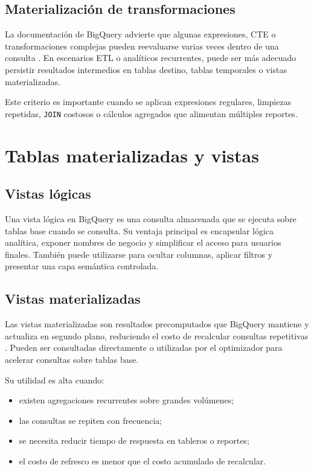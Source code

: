 \documentclass[12pt]{article}
\begin{document}
\subsection{Materialización de transformaciones}
La documentación de BigQuery advierte que algunas expresiones, CTE o transformaciones complejas pueden reevaluarse varias veces dentro de una consulta \cite{gcp_optimize_queries_compute}. En escenarios ETL o analíticos recurrentes, puede ser más adecuado persistir resultados intermedios en tablas destino, tablas temporales o vistas materializadas.

Este criterio es importante cuando se aplican expresiones regulares, limpiezas repetidas, \texttt{JOIN} costosos o cálculos agregados que alimentan múltiples reportes.

\section{Tablas materializadas y vistas}
\subsection{Vistas lógicas}
Una vista lógica en BigQuery es una consulta almacenada que se ejecuta sobre tablas base cuando se consulta. Su ventaja principal es encapsular lógica analítica, exponer nombres de negocio y simplificar el acceso para usuarios finales. También puede utilizarse para ocultar columnas, aplicar filtros y presentar una capa semántica controlada.

\subsection{Vistas materializadas}
Las vistas materializadas son resultados precomputados que BigQuery mantiene y actualiza en segundo plano, reduciendo el costo de recalcular consultas repetitivas \cite{gcp_materialized_views_intro}. Pueden ser consultadas directamente o utilizadas por el optimizador para acelerar consultas sobre tablas base.

Su utilidad es alta cuando:

\begin{itemize}[leftmargin=*]
\item existen agregaciones recurrentes sobre grandes volúmenes;
\item las consultas se repiten con frecuencia;
\item se necesita reducir tiempo de respuesta en tableros o reportes;
\item el costo de refresco es menor que el costo acumulado de recalcular.
\end{itemize}
\end{document}
